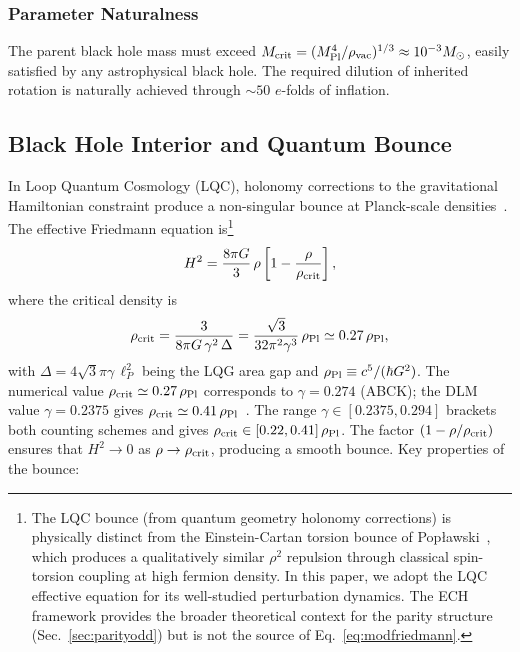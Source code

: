 \documentclass[aps,prd,twocolumn,superscriptaddress,showpacs,preprintnumbers,nofootinbib,longbibliography,floatfix]{revtex4-2}
\newcommand{\rhocrit}{\rho_{\rm crit}}
\newcommand{\rhoPl}{\rho_{\rm Pl}}
\begin{document}
\subsubsection{Parameter Naturalness}\label{sec:naturalness}
The parent black hole mass must exceed $M_{\rm crit} = (M_{\rm Pl}^4/\rho_{\rm vac})^{1/3}\approx 10^{-3}M_\odot$, easily satisfied by any astrophysical black hole. The required dilution of inherited rotation is naturally achieved through $\sim 50$ $e$-folds of inflation.


\subsection{Black Hole Interior and Quantum Bounce}\label{sec:bounce}

In Loop Quantum Cosmology (LQC), holonomy corrections to the gravitational Hamiltonian constraint produce a non-singular bounce at Planck-scale densities~\cite{Ashtekar2011}. The effective Friedmann equation is\footnote{The LQC bounce (from quantum geometry holonomy corrections) is physically distinct from the Einstein-Cartan torsion bounce of Pop\l{}awski~\cite{Poplawski2012}, which produces a qualitatively similar $\rho^2$ repulsion through classical spin-torsion coupling at high fermion density. In this paper, we adopt the LQC effective equation for its well-studied perturbation dynamics. The ECH framework provides the broader theoretical context for the parity structure (Sec.~\ref{sec:parityodd}) but is not the source of Eq.~\eqref{eq:modfriedmann}.}
\begin{equation}\label{eq:modfriedmann}
H^2 = \frac{8\pi G}{3}\,\rho\left[1-\frac{\rho}{\rhocrit}\right],
\end{equation}
where the critical density is
\begin{equation}\label{eq:rhocrit}
\rhocrit = \frac{3}{8\pi G\,\gamma^2\,\Delta} = \frac{\sqrt{3}}{32\pi^2\gamma^3}\,\rhoPl \simeq 0.27\,\rhoPl,
\end{equation}
with $\Delta = 4\sqrt{3}\pi\gamma\,\ell_P^2$ being the LQG area gap and $\rhoPl\equiv c^5/(\hbar G^2)$. The numerical value $\rhocrit \simeq 0.27\,\rhoPl$ corresponds to $\gamma = 0.274$ (ABCK); the DLM value $\gamma = 0.2375$ gives $\rhocrit \simeq 0.41\,\rhoPl$~\cite{Ashtekar2011}. The range $\gamma \in [0.2375, 0.294]$ brackets both counting schemes and gives $\rhocrit \in [0.22, 0.41]\,\rhoPl$. The factor $(1-\rho/\rhocrit)$ ensures that $H^2 \to 0$ as $\rho \to \rhocrit$, producing a smooth bounce. Key properties of the bounce:
\end{document}

